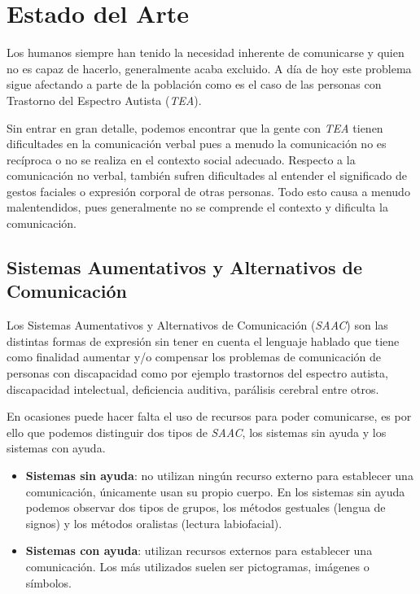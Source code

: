 \chapter{Estado del Arte}
\label{cap:estadoDeLaCuestion}


Los humanos siempre  han tenido la necesidad inherente de comunicarse y quien no es capaz de hacerlo, generalmente acaba excluido. A día de hoy este problema sigue afectando a parte de la población como es el caso de las personas con Trastorno del Espectro Autista (\textit{TEA}).

Sin entrar en gran detalle, podemos encontrar que la gente con \textit{TEA} tienen dificultades en la comunicación verbal pues a menudo la comunicación no es recíproca o no se realiza en el contexto social adecuado. Respecto a la comunicación no verbal, también sufren dificultades al entender el significado de gestos faciales o expresión corporal de otras personas. Todo esto causa a menudo malentendidos, pues generalmente no se comprende el contexto y dificulta la comunicación. 


\section{Sistemas Aumentativos y Alternativos de Comunicación}
Los Sistemas Aumentativos y Alternativos de Comunicación (\textit{SAAC}) son las distintas formas de expresión sin tener en cuenta el lenguaje hablado que tiene como finalidad aumentar y/o compensar los problemas de comunicación de personas con discapacidad como por ejemplo trastornos del espectro autista, discapacidad intelectual, deficiencia auditiva, parálisis cerebral entre otros.

En ocasiones puede hacer falta el uso de recursos para poder comunicarse, es por ello que podemos distinguir dos tipos de \textit{SAAC}, los sistemas sin ayuda y los sistemas con ayuda.
\newpage
\begin{itemize}
	\item \textbf{Sistemas sin ayuda}: no utilizan ningún recurso externo para establecer una comunicación, únicamente usan su propio cuerpo. En los sistemas sin ayuda podemos observar dos tipos de grupos, los métodos gestuales (lengua de signos) y los métodos oralistas (lectura labiofacial). 
	\item \textbf{Sistemas con ayuda}: utilizan recursos externos para establecer una comunicación. Los más utilizados suelen ser pictogramas, imágenes o símbolos.
\end{itemize}


